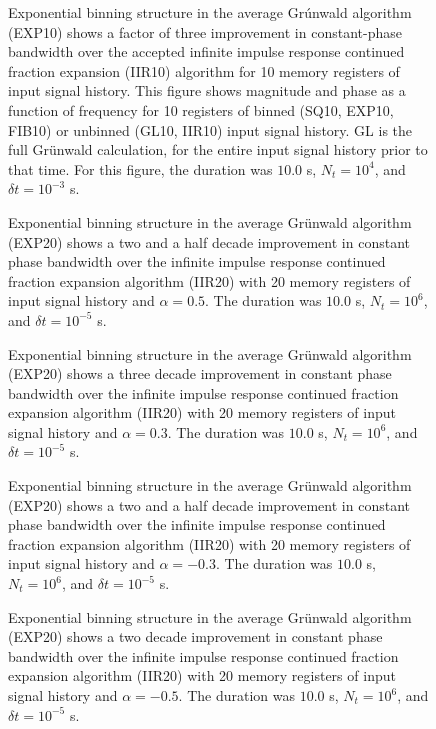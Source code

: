 \begin{figure}
\caption{Exponential binning structure in the average Gr{\'u}nwald algorithm (EXP10) shows a factor of three improvement in constant-phase bandwidth over the accepted infinite impulse response continued fraction expansion (IIR10) algorithm for 10 memory registers of input signal history. This figure shows magnitude and phase as a function of frequency for 10
  registers of binned (SQ10, EXP10, FIB10) or unbinned (GL10, IIR10)
  input signal history. GL is the full Gr{\"u}nwald calculation, for the
  entire input signal history prior to that time. For this figure, the duration was $10.0$ s, $N_t=10^4$, and $\delta t = 10^{-3}$ s.}
\label{fig:bode10p05}
\end{figure}

\begin{figure}
\caption{Exponential binning structure in the average Gr{\"u}nwald algorithm (EXP20) shows a two and a half decade improvement in constant phase bandwidth over the infinite impulse response continued fraction expansion algorithm (IIR20) with 20 memory registers of input signal history and $\alpha=0.5$. The duration was $10.0$ s, $N_t=10^6$, and $\delta t = 10^{-5}$ s.}
\label{fig:bode20p05}
\end{figure}

\begin{figure}

\caption{Exponential binning structure in the average Gr{\"u}nwald algorithm (EXP20) shows a three decade improvement in constant phase bandwidth over the infinite impulse response continued fraction expansion algorithm (IIR20) with 20 memory registers of input signal history and $\alpha=0.3$. The duration was $10.0$ s, $N_t=10^6$, and $\delta t = 10^{-5}$ s.}
\label{fig:bode20p03}
\end{figure}

\begin{figure}

\caption{Exponential binning structure in the average Gr{\"u}nwald algorithm (EXP20) shows a two and a half decade improvement in constant phase bandwidth over the infinite impulse response continued fraction expansion algorithm (IIR20) with 20 memory registers of input signal history and $\alpha=-0.3$. The duration was $10.0$ s, $N_t=10^6$, and $\delta t = 10^{-5}$ s.}
\label{fig:bode20m03}
\end{figure}

\begin{figure}
\caption{Exponential binning structure in the average Gr{\"u}nwald algorithm (EXP20) shows a two decade improvement in constant phase bandwidth over the infinite impulse response continued fraction expansion algorithm (IIR20) with 20 memory registers of input signal history and $\alpha=-0.5$. The duration was $10.0$ s, $N_t=10^6$, and $\delta t = 10^{-5}$ s. }
\label{fig:bode20m05}
\end{figure}